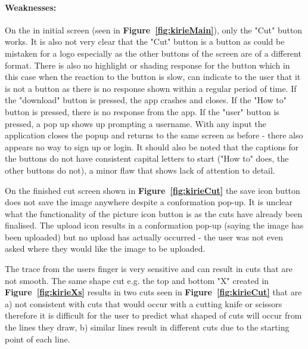 \documentclass[11pt]{article}
\begin{document}
                
                \paragraph{Weaknesses:}
                On the in initial screen (seen in \textbf{Figure~\ref{fig:kirieMain}}), only the "Cut" button works. It is also not very clear that the "Cut" button is a button as could be  mistaken for a logo especially as the other buttons of the screen are of a different format. There is also no highlight or shading response for the button which in this case when the reaction to the button is slow, can indicate to the user that it is not a button as there is no response shown within a regular period of time. If the "download" button is pressed, the app crashes and closes. If the "How to" button is pressed, there is no response from the app. If the "user" button is pressed, a pop up shows up prompting a username. With any input the application closes the popup and returns to the same screen as before - there also appears no way to sign up or login. It should also be noted that the captions for the buttons do not have consistent capital letters to start ("How to" does, the other buttons do not), a minor flaw that shows lack of attention to detail.
                
                On the finished cut screen shown in \textbf{Figure~\ref{fig:kirieCut}} the save icon button does not save the image anywhere despite a conformation pop-up. It is unclear what the functionality of the picture icon button is as the cuts have already been finalised. The upload icon results in a conformation pop-up (saying the image has been uploaded) but no upload has actually occurred - the user was not even asked where they would like the image to be uploaded. 
                
                The trace from the users finger is very sensitive and can result in cuts that are not smooth. The same shape cut e.g. the top and bottom "X" created in \textbf{Figure~\ref{fig:kirieXs}} results in two cuts seen in \textbf{Figure~\ref{fig:kirieCut}} that are a) not consistent with cuts that would occur with a cutting knife or scissors therefore it is difficult for the user to predict what shaped of cuts will occur from the lines they draw, b) similar lines result in different cuts due to the starting point of each line.
                
\end{document}
